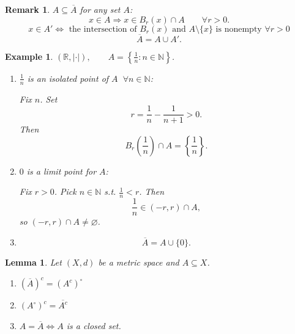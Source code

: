 \documentclass[12pt]{article}
\newtheorem*{lemma}{Lemma}
\newtheorem*{remark}{Remark}
\newtheorem{example}{Example}
\begin{document}
\begin{remark}
$A\subseteq \overline{A}$ for any set $A$:
\[
x\in A \Rightarrow x\in B_r(x)\cap A \qquad \forall r>0.
\]
\[
x\in A' \Leftrightarrow \text{ the intersection of } B_r(x) \text{ and }
A\setminus\{x\} \text{ is nonempty } \forall r>0
\]
\[
\overline{A}=A\cup A'.
\]
\end{remark}

\begin{example}
$(\mathbb{R},|\cdot|),\qquad A=\left\{\frac{1}{n}: n\in\mathbb{N}\right\}$.
\begin{enumerate}[label=\textbf{(\arabic*)}]
  \item $\frac{1}{n}$ is an isolated point of $A$ $\ \forall n\in\mathbb{N}$:

  Fix $n$. Set
  \[
  r=\frac{1}{n}-\frac{1}{n+1}>0.
  \]
  Then
  \[
  B_r\left(\frac{1}{n}\right)\cap A=\left\{\frac{1}{n}\right\}.
  \]
  \item $0$ is a limit point for $A$:

  Fix $r>0$. Pick $n\in\mathbb{N}$ s.t. $\frac{1}{n}<r$.
  Then
  \[
  \frac{1}{n}\in (-r,r)\cap A,
  \]
  so $(-r,r)\cap A\neq\varnothing$.
  \item
  \[
  \overline{A}=A\cup\{0\}.
  \]
\end{enumerate}
\end{example}

\begin{lemma}
Let $(X,d)$ be a metric space and $A\subseteq X$.
\begin{enumerate}[label=\textbf{(\arabic*)}]
  \item $(\overline{A})^c=(A^c)^\circ$
  \item $(A^\circ)^c=\overline{A^c}$
  \item $A=\overline{A}\iff A$ is a closed set.
\end{enumerate}
\end{lemma}
\end{document}
